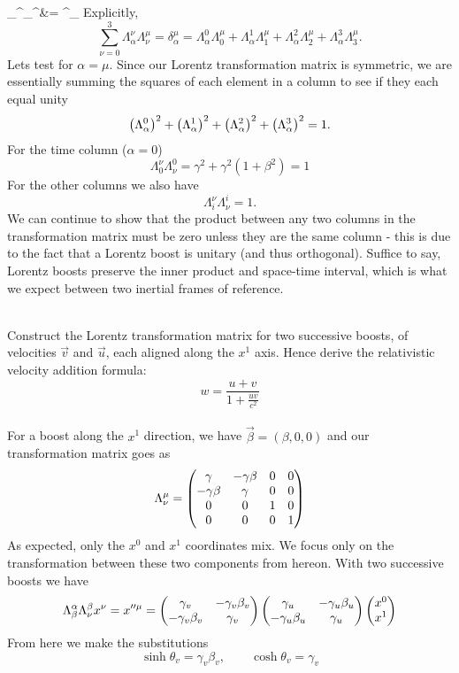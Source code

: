 \documentclass[10pt,letterpaper]{article}
\begin{document}
		\Lambda_\alpha^\nu \Lambda_{\nu}^\mu &= \delta^\mu_\alpha
	\ea 
	Explicitly, 
	\[
		\sum_{\nu=0}^3 \Lambda_\alpha^\nu \Lambda_{\nu}^\mu = \delta^\mu_\alpha = 
		\Lambda_\alpha^0\Lambda_0^\mu + \Lambda_\alpha^1\Lambda_1^\mu +
		\Lambda_\alpha^2\Lambda_2^\mu + \Lambda_\alpha^3\Lambda_3^\mu.
	\]
	Lets test for $\alpha = \mu$. Since our Lorentz transformation matrix is symmetric,
	we are essentially summing the squares of each element in a column to see if they each
	equal unity
	\[
		\left(\Lambda^0_\alpha\right)^2 + \left(\Lambda^1_\alpha\right)^2 + \left(\Lambda^2_\alpha\right)^2 +
		\left(\Lambda^3_\alpha\right)^2  = 1.
	\]
	For the time column ($\alpha = 0$)
	\[
		\Lambda^\nu_0\Lambda^0_\nu = \gamma^2 +\gamma^2(1+\beta^2) = 1
	\]
	For the other columns we also have
	\[
		\Lambda^\nu_i\Lambda^i_\nu = 1.
	\]
	We can continue to show that the product between any two columns in the transformation matrix must 
	be zero unless they are the same column - this is due to the fact that a Lorentz boost 
	is unitary (and thus orthogonal). Suffice to say, Lorentz boosts preserve the inner product and space-time 
	interval, which is what we expect between two inertial frames of reference. 
	\\
	\\
	\item
	Construct the Lorentz transformation matrix for two successive boosts, of velocities $\vec v$ and $\vec u$,
	each aligned along the $x^1$ axis. Hence derive the relativistic velocity addition formula:
	\[
		w = \frac{u+v}{1+\frac{uv}{c^2}}
	\]
	\\
	For a boost along the $x^1$ direction, we have $\vec\beta = (\beta,0,0)$ and our transformation
	matrix goes as 
	\[
		\Lambda^\mu_\nu = \begin{pmatrix} \gamma & -\gamma \beta & 0 & 0
		\\ -\gamma\beta &\gamma & 0 & 0 \\
		0& 0& 1& 0 \\ 0 & 0& 0&1\end{pmatrix}
	\]
	As expected, only the $x^0$ and $x^1$ coordinates mix. We focus only on the transformation 
	between these two components from hereon. With two successive boosts we have
	\[
		\Lambda_\beta^\alpha \Lambda_\nu^\beta x^\nu = x''^\mu = 
		\begin{pmatrix} \gamma_v &-\gamma_v\beta_v \\ -\gamma_v\beta_v & \gamma_v \end{pmatrix}
		\begin{pmatrix} \gamma_u &-\gamma_u\beta_u \\ -\gamma_u\beta_u & \gamma_u \end{pmatrix}
		\begin{pmatrix} x^0 \\ x^1 \end{pmatrix}
	\]
	From here we make the substitutions
	\[
		\sinh \theta_v = \gamma_v\beta_v, \qquad \cosh\theta_v = \gamma_v
	\]
\end{document}
